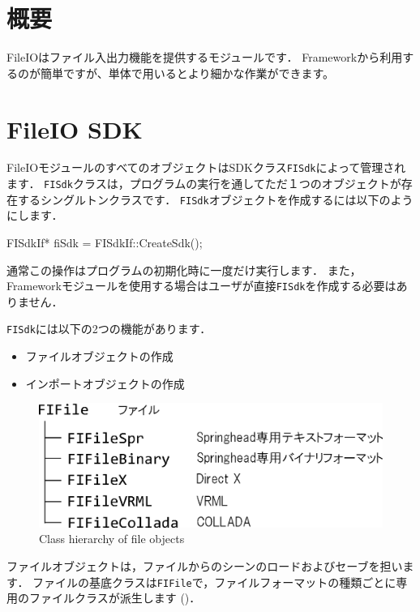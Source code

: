 \KLUDGE %
\KLUDGE %
\KLUDGE %
\KLUDGE %

\section{概要}

FileIOはファイル入出力機能を提供するモジュールです．
Frameworkから利用するのが簡単ですが、単体で用いるとより細かな作業ができます。

\section{FileIO SDK}

FileIOモジュールのすべてのオブジェクトはSDKクラス\texttt{FISdk}によって管理されます．
\texttt{FISdk}クラスは，プログラムの実行を通してただ１つのオブジェクトが存在するシングルトンクラスです．
\texttt{FISdk}オブジェクトを作成するには以下のようにします．
\begin{sourcecode}
FISdkIf* fiSdk = FISdkIf::CreateSdk();
\end{sourcecode}
\KLUDGE 通常この操作はプログラムの初期化時に一度だけ実行します．
\KLUDGE また，Frameworkモジュールを使用する場合はユーザが直接\texttt{FISdk}を作成する必要はありません．

\texttt{FISdk}には以下の2つの機能があります．
\begin{itemize}
\item ファイルオブジェクトの作成
\item インポートオブジェクトの作成
\end{itemize}

\begin{figure}[t]
\begin{center}
\includegraphics[width=.6\hsize]{fig/fifile.eps}
\end{center}
\caption{Class hierarchy of file objects}
\label{fig_fifile}
\end{figure}

\KLUDGE ファイルオブジェクトは，ファイルからのシーンのロードおよびセーブを担います．
\KLUDGE ファイルの基底クラスは\texttt{FIFile}で，ファイルフォーマットの種類ごとに専用のファイルクラスが派生します
()．

